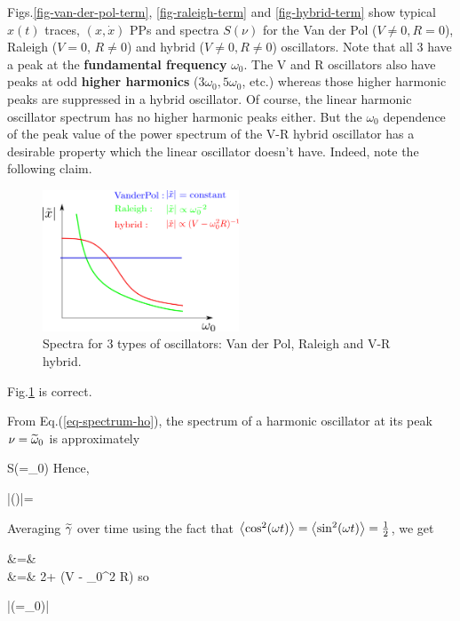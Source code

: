 Figs.\ref{fig-van-der-pol-term},
\ref{fig-raleigh-term}
and \ref{fig-hybrid-term}
show typical
$x(t)$ traces, $(x, \dot{x})$
PPs and spectra $S(\nu)$
for the Van der Pol ($V\neq 0,R=0$), Raleigh
($V=0$, $R\neq 0$) and hybrid  ($V\neq 0,R\neq 0$)
oscillators.
Note that all 3
have a peak at 
the {\bf fundamental frequency} $\omega_0$.
The V and R oscillators also have peaks   
at
odd {\bf higher harmonics} ($3\omega_0, 5\omega_0$, etc.)
whereas those higher harmonic peaks are
suppressed in a hybrid oscillator.
Of course, the linear harmonic oscillator
 spectrum has no higher harmonic peaks either.
But the $\omega_0$ dependence of
the peak value of the power spectrum of the V-R hybrid oscillator
has a desirable property which the linear oscillator doesn't have. Indeed, note the following claim. 


\begin{figure}[h!]
\centering
\includegraphics[width=2.3in]
{dynamical-sys/3-oscillator-spectra.png}
\caption{Spectra for 3 types of oscillators: Van der Pol, 
Raleigh and V-R hybrid.}
\label{fig-3-oscillator-spectra}
\end{figure}

\begin{claim}
Fig.\ref{fig-3-oscillator-spectra}  is correct.
\end{claim}
\proof

From Eq.(\ref{eq-spectrum-ho}), the
spectrum of a harmonic oscillator at its peak 
$\nu={\widetilde{\omega}}_0$ is approximately

\beq
S(\nu=\TIL{\omega}_0)\approx {}
\eeq
Hence, 

\beq
|(\nu)|=
\approx {}
\eeq

Averaging ${\widetilde{\gamma}}$ over time
using the fact that $\left\langle\cos^2(\omega t)\right\rangle
=\left\langle\sin^2(\omega t)\right\rangle=\frac{1}{2}$, we get


\beqa
\av{2\TIL{\gamma}} &=&
\\
&=& 
2\gamma + (V  - \omega_0^2 R)
\eeqa
so

\beq
|(\nu=\omega_0)|\approx
{}
\eeq

